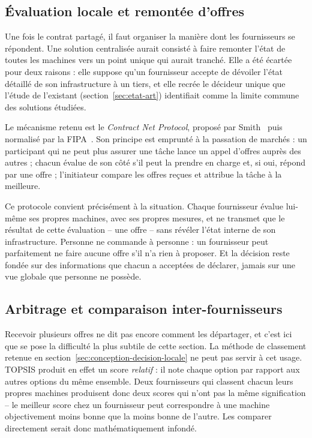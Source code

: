 \subsection{Évaluation locale et remontée d'offres}

Une fois le contrat partagé, il faut organiser la manière dont les fournisseurs se répondent. Une solution centralisée aurait consisté à faire remonter l'état de toutes les machines vers un point unique qui aurait tranché. Elle a été écartée pour deux raisons : elle suppose qu'un fournisseur accepte de dévoiler l'état détaillé de son infrastructure à un tiers, et elle recrée le décideur unique que l'étude de l'existant (section~\ref{sec:etat-art}) identifiait comme la limite commune des solutions étudiées.

Le mécanisme retenu est le \emph{Contract Net Protocol}, proposé par Smith~\cite{smith1980contractnet} puis normalisé par la FIPA~\cite{fipa2002cnp}. Son principe est emprunté à la passation de marchés : un participant qui ne peut plus assurer une tâche lance un appel d'offres auprès des autres ; chacun évalue de son côté s'il peut la prendre en charge et, si oui, répond par une offre ; l'initiateur compare les offres reçues et attribue la tâche à la meilleure.

Ce protocole convient précisément à la situation. Chaque fournisseur évalue lui-même ses propres machines, avec ses propres mesures, et ne transmet que le résultat de cette évaluation -- une offre -- sans révéler l'état interne de son infrastructure. Personne ne commande à personne : un fournisseur peut parfaitement ne faire aucune offre s'il n'a rien à proposer. Et la décision reste fondée sur des informations que chacun a acceptées de déclarer, jamais sur une vue globale que personne ne possède.

\subsection{Arbitrage et comparaison inter-fournisseurs}

Recevoir plusieurs offres ne dit pas encore comment les départager, et c'est ici que se pose la difficulté la plus subtile de cette section. La méthode de classement retenue en section~\ref{sec:conception-decision-locale} ne peut pas servir à cet usage. TOPSIS produit en effet un score \emph{relatif} : il note chaque option par rapport aux autres options du même ensemble. Deux fournisseurs qui classent chacun leurs propres machines produisent donc deux scores qui n'ont pas la même signification -- le meilleur score chez un fournisseur peut correspondre à une machine objectivement moins bonne que la moins bonne de l'autre. Les comparer directement serait donc mathématiquement infondé.

